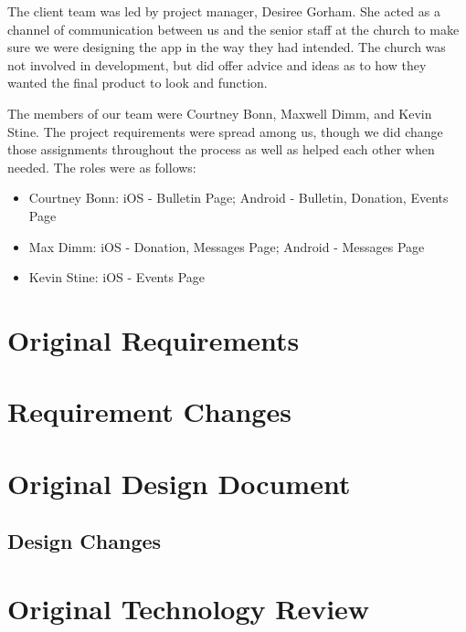 \documentclass[letterpaper,10pt,draftclsnofoot,onecolumn,titlepage]{IEEEtran}
\begin{document}
The client team was led by project manager, Desiree Gorham. 
She acted as a channel of communication between us and the senior staff at the church to make sure we were designing the app in the way they had intended. 
The church was not involved in development, but did offer advice and ideas as to how they wanted the final product to look and function. 

The members of our team were Courtney Bonn, Maxwell Dimm, and Kevin Stine. 
The project requirements were spread among us, though we did change those assignments throughout the process as well as helped each other when needed. 
The roles were as follows: 

\begin{itemize}
	\item Courtney Bonn: iOS - Bulletin Page; Android - Bulletin, Donation, Events Page
	\item Max Dimm: iOS - Donation, Messages Page; Android - Messages Page
	\item Kevin Stine: iOS - Events Page
\end{itemize}

\section{Original Requirements}

	

\section{Requirement Changes}

\section{Original Design Document}

	
	
	\subsection{Design Changes}
	
\section{Original Technology Review}

	
\end{document}
